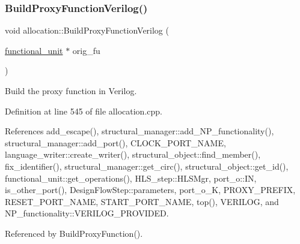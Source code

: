 \subsubsection{\texorpdfstring{Build\+Proxy\+Function\+Verilog()}{BuildProxyFunctionVerilog()}}
{\footnotesize\ttfamily void allocation\+::\+Build\+Proxy\+Function\+Verilog (\begin{DoxyParamCaption}\item[{\hyperlink{structfunctional__unit}{functional\+\_\+unit} $\ast$}]{orig\+\_\+fu }\end{DoxyParamCaption})\hspace{0.3cm}{\ttfamily [protected]}}



Build the proxy function in Verilog. 



Definition at line 545 of file allocation.\+cpp.



References add\+\_\+escape(), structural\+\_\+manager\+::add\+\_\+\+N\+P\+\_\+functionality(), structural\+\_\+manager\+::add\+\_\+port(), C\+L\+O\+C\+K\+\_\+\+P\+O\+R\+T\+\_\+\+N\+A\+ME, language\+\_\+writer\+::create\+\_\+writer(), structural\+\_\+object\+::find\+\_\+member(), fix\+\_\+identifier(), structural\+\_\+manager\+::get\+\_\+circ(), structural\+\_\+object\+::get\+\_\+id(), functional\+\_\+unit\+::get\+\_\+operations(), H\+L\+S\+\_\+step\+::\+H\+L\+S\+Mgr, port\+\_\+o\+::\+IN, is\+\_\+other\+\_\+port(), Design\+Flow\+Step\+::parameters, port\+\_\+o\+\_\+K, P\+R\+O\+X\+Y\+\_\+\+P\+R\+E\+F\+IX, R\+E\+S\+E\+T\+\_\+\+P\+O\+R\+T\+\_\+\+N\+A\+ME, S\+T\+A\+R\+T\+\_\+\+P\+O\+R\+T\+\_\+\+N\+A\+ME, top(), V\+E\+R\+I\+L\+OG, and N\+P\+\_\+functionality\+::\+V\+E\+R\+I\+L\+O\+G\+\_\+\+P\+R\+O\+V\+I\+D\+ED.



Referenced by Build\+Proxy\+Function().

